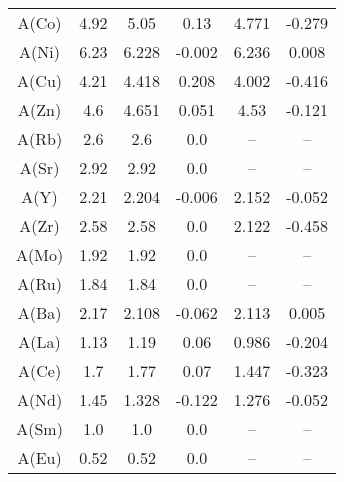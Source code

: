 \begin{table}[ht]
\begin{tabular}{cccccc}
A(Co) & 4.92 & 5.05 & 0.13 & 4.771 & -0.279 \\
A(Ni) & 6.23 & 6.228 & -0.002 & 6.236 & 0.008 \\
A(Cu) & 4.21 & 4.418 & 0.208 & 4.002 & -0.416 \\
A(Zn) & 4.6 & 4.651 & 0.051 & 4.53 & -0.121 \\
A(Rb) & 2.6 & 2.6 & 0.0 & -- & -- \\
A(Sr) & 2.92 & 2.92 & 0.0 & -- & -- \\
A(Y) & 2.21 & 2.204 & -0.006 & 2.152 & -0.052 \\
A(Zr) & 2.58 & 2.58 & 0.0 & 2.122 & -0.458 \\
A(Mo) & 1.92 & 1.92 & 0.0 & -- & -- \\
A(Ru) & 1.84 & 1.84 & 0.0 & -- & -- \\
A(Ba) & 2.17 & 2.108 & -0.062 & 2.113 & 0.005 \\
A(La) & 1.13 & 1.19 & 0.06 & 0.986 & -0.204 \\
A(Ce) & 1.7 & 1.77 & 0.07 & 1.447 & -0.323 \\
A(Nd) & 1.45 & 1.328 & -0.122 & 1.276 & -0.052 \\
A(Sm) & 1.0 & 1.0 & 0.0 & -- & -- \\
A(Eu) & 0.52 & 0.52 & 0.0 & -- & -- \\
\hline
\end{tabular}
\end{table}